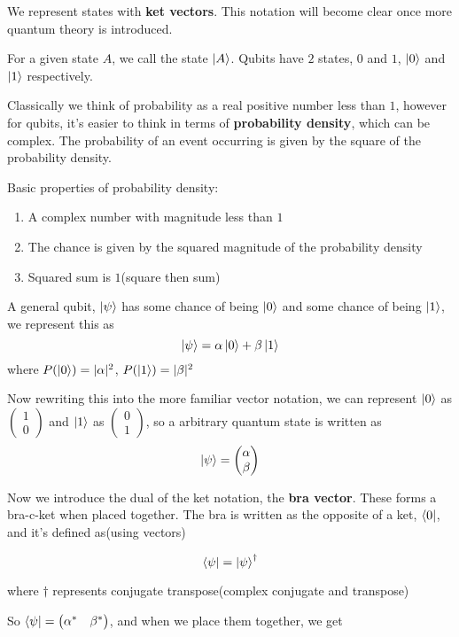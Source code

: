 \documentclass{report}
\begin{document}
We represent states with \textbf{ket vectors}. This notation will become clear once more quantum theory is introduced.

For a given state $A$, we call the state $\ket{A}$. Qubits have $2$ states, $0$ and $1$, $\ket{0}$ and $\ket{1}$ respectively.

Classically we think of probability as a real positive number less than $1$, however for qubits, it's easier to think in terms of \textbf{probability density}, which can be complex. The probability of an event occurring is given by the square of the probability density.

Basic properties of probability density:
\begin{enumerate}
	\item A complex number with magnitude less than $1$
	\item The chance is given by the squared magnitude of the probability density
	\item Squared sum is $1$(square then sum)
\end{enumerate}

A general qubit, $\ket{\psi}$ has some chance of being $\ket{0}$ and some chance of being $\ket{1}$, we represent this as 
$$\ket{\psi}=\alpha\ket{0}+\beta\ket{1}$$
where $P(\ket{0})=|\alpha|^2$, $P(\ket{1})=|\beta|^2$

Now rewriting this into the more familiar vector notation, we can represent $\ket{0}$ as $\begin{pmatrix}1\\0\end{pmatrix}$ and $\ket{1}$ as $\begin{pmatrix}0\\1\end{pmatrix}$, so a arbitrary quantum state is written as
$$\ket{\psi}=\begin{pmatrix}\alpha\\\beta\end{pmatrix}$$

Now we introduce the dual of the ket notation, the \textbf{bra vector}. These forms a bra-c-ket when placed together. The bra is written as the opposite of a ket, $\bra{0}$, and it's defined as(using vectors)

$$\bra{\psi}=\ket{\psi}^\dagger$$

where $\dagger$ represents conjugate transpose(complex conjugate and transpose)

So $\bra{\psi}=\begin{pmatrix}\alpha^*&\beta^*\end{pmatrix}$, and when we place them together, we get
\end{document}
